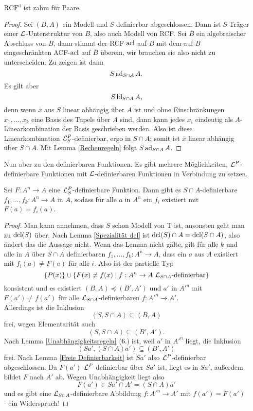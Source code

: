 \begin{lemma}\label{RCF zahm}
	$\operatorname{RCF^d}$ ist zahm für Paare.
\end{lemma}
\begin{proof}
	Sei $(B,A)$ ein Modell und $S$ definierbar abgeschlossen. Dann ist $S$ Träger einer $\mathcal{L}$-Unterstruktur von $B$, also auch Modell von RCF. Sei $\overline{B}$ ein algebraischer Abschluss von $B$, dann stimmt der RCF-$\operatorname{acl}$ auf $B$ mit dem auf $B$ eingeschränkten ACF-$\operatorname{acl}$ auf $\overline{B}$ überein, wir brauchen sie also nicht zu unterscheiden. Zu zeigen ist dann $$S\operatorname{ad}_{S\cap A}A.$$
	Es gilt aber $$S\operatorname{ld}_{S\cap A}A,$$ denn wenn $\overline{x}$ aus $S$ linear abhängig über $A$ ist und ohne Einschränkungen $x_1,\dots,x_k$ eine Basis des Tupels über $A$ sind, dann kann jedes $x_i$ eindeutig als $A$-Linearkombination der Basis geschrieben werden. Also ist diese Linearkombination $\mathcal{L}^P_S$-definierbar, ergo in $S\cap A$; somit ist $\overline{x}$ linear abhängig über $S\cap A$. Mit Lemma \ref{Rechenregeln} folgt $S\operatorname{ad}_{S\cap A}A$.
\end{proof}

Nun aber zu den definierbaren Funktionen. Es gibt mehrere Möglichkeiten, $\mathcal{L}^P$-definierbare Funktionen mit $\mathcal{L}$-definierbaren Funktionen in Verbindung zu setzen.

\begin{lemma}
	Sei $F:A^n\rightarrow A$ eine $\mathcal{L}^P_S$-definierbare Funktion. Dann gibt es $S\cap A$-definierbare $f_1,\dots,f_k:A^n\rightarrow A$ in $A$, sodass für alle $a$ in $A^n$ ein $f_i$ existiert mit $F(a)=f_i(a)$.
\end{lemma}
\begin{proof}
	Man kann annehmen, dass $S$ schon Modell von T ist, ansonsten geht man zu $\operatorname{dcl}(S)$ über. Nach Lemma \ref{Spezialität dcl} ist $\operatorname{dcl}(S)\cap A=\operatorname{dcl}(S\cap A)$, also ändert das die Aussage nicht.\newpage
	Wenn das Lemma nicht gälte, gilt für alle $k$ und alle in $A$ über $S\cap A$ definierbaren $f_1,\dots,f_k:A^n\rightarrow A$, dass ein $a$ aus $A$ existiert mit $f_i(a)\neq F(a)$ für alle $i$. Also ist der partielle Typ $$\{P(x)\}\cup\{F(x)\neq f(x)\mid f:A^n\rightarrow A\ \mathcal{L}_{S\cap A}\text{-definierbar}\}$$ konsistent und es existiert $(B,A)\preceq(B',A')$ und $a'$ in $A'^n$ mit $F(a')\neq f(a')$ für alle $\mathcal{L}_{S\cap A}$-definierbaren $f:A'^n\rightarrow A'$.\\
	Allerdings ist die Inklusion $$(S,S\cap A)\subseteq (B,A)$$ frei, wegen Elementarität auch $$(S,S\cap A)\subseteq (B',A').$$ Nach Lemma \ref{Unabhängigkeitsregeln} (6.) ist, weil $a'$ in $A'^n$ liegt, die Inklusion $$(Sa',(S\cap A)a')\subseteq(B',A')$$ frei. Nach Lemma \ref{Freie Definierbarkeit} ist $Sa'$ also $\mathcal{L}^P$-definierbar abgeschlossen. Da $F(a')$ $\mathcal{L}^P$-definierbar über $Sa'$ ist, liegt es in $Sa'$, außerdem bildet $F$ nach $A'$ ab. Wegen Unabhängigkeit liegt also $$F(a')\in Sa'\cap A'=(S\cap A)a'$$ und es gibt eine $\mathcal{L}_{S\cap A}$-definierbare Abbildung $f:A'^n\rightarrow A'$ mit $f(a')=F(a')$ - ein Widerspruch!
\end{proof}

